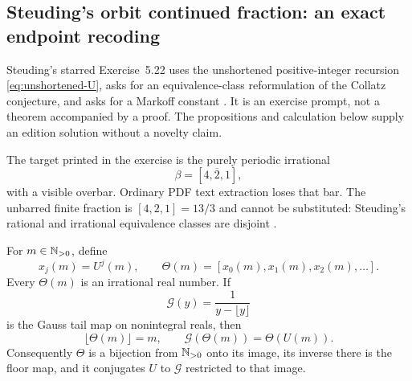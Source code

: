 \subsection{Steuding's orbit continued fraction: an exact endpoint recoding}
\label{subsec:Steuding-522}

Steuding's starred Exercise~5.22 uses the unshortened positive-integer
recursion \eqref{eq:unshortened-U}, asks for an equivalence-class
reformulation of the Collatz conjecture, and asks for a Markoff constant
\cite[physical PDF p.~100; printed p.~87, Ex.~5.22]{Steuding2005}.
It is an exercise prompt, not a theorem accompanied by a proof.  The
propositions and calculation below supply an edition solution without a
novelty claim.

The target printed in the exercise is the purely periodic irrational
\[
 \beta=[\overline{4,2,1}],
\]
with a visible overbar.  Ordinary PDF text extraction loses that bar.  The
unbarred finite fraction is $[4,2,1]=13/3$ and cannot be substituted:
Steuding's rational and irrational equivalence classes are disjoint
\cite[printed p.~79]{Steuding2005}.

\begin{proposition}
\label{prop:Steuding-orbit-CF-morphism}
For $m\in\mathbb{N}_{>0}$, define
\begin{equation}
\label{eq:Steuding-Theta}
 x_j(m)=U^j(m),
 \qquad
 \Theta(m)=[x_0(m),x_1(m),x_2(m),\ldots].
\end{equation}
Every $\Theta(m)$ is an irrational real number.  If
\[
 \mathcal G(y)=\frac{1}{y-\lfloor y\rfloor}
\]
is the Gauss tail map on nonintegral reals, then
\begin{equation}
\label{eq:Steuding-Gauss-conjugacy}
 \lfloor\Theta(m)\rfloor=m,
 \qquad
 \mathcal G(\Theta(m))=\Theta(U(m)).
\end{equation}
Consequently $\Theta$ is a bijection from $\mathbb{N}_{>0}$ onto its image, its inverse
there is the floor map, and it conjugates $U$ to $\mathcal G$ restricted to
that image.
\end{proposition}

